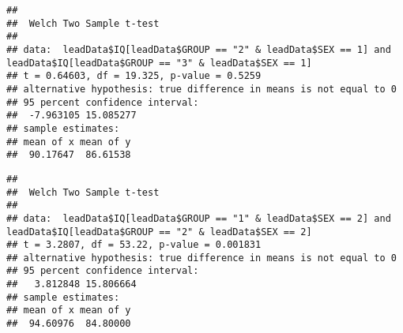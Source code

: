 \documentclass[
]{article}
\newenvironment{Shaded}{\begin{snugshade}}{\end{snugshade}}
\newcommand{\DataTypeTok}[1]{\textcolor[rgb]{0.13,0.29,0.53}{#1}}
\newcommand{\DecValTok}[1]{\textcolor[rgb]{0.00,0.00,0.81}{#1}}
\newcommand{\KeywordTok}[1]{\textcolor[rgb]{0.13,0.29,0.53}{\textbf{#1}}}
\newcommand{\NormalTok}[1]{#1}
\newcommand{\OperatorTok}[1]{\textcolor[rgb]{0.81,0.36,0.00}{\textbf{#1}}}
\newcommand{\StringTok}[1]{\textcolor[rgb]{0.31,0.60,0.02}{#1}}
\begin{document}
\begin{verbatim}
## 
##  Welch Two Sample t-test
## 
## data:  leadData$IQ[leadData$GROUP == "2" & leadData$SEX == 1] and leadData$IQ[leadData$GROUP == "3" & leadData$SEX == 1]
## t = 0.64603, df = 19.325, p-value = 0.5259
## alternative hypothesis: true difference in means is not equal to 0
## 95 percent confidence interval:
##  -7.963105 15.085277
## sample estimates:
## mean of x mean of y 
##  90.17647  86.61538
\end{verbatim}

\begin{Shaded}
\end{Shaded}

\begin{verbatim}
## 
##  Welch Two Sample t-test
## 
## data:  leadData$IQ[leadData$GROUP == "1" & leadData$SEX == 2] and leadData$IQ[leadData$GROUP == "2" & leadData$SEX == 2]
## t = 3.2807, df = 53.22, p-value = 0.001831
## alternative hypothesis: true difference in means is not equal to 0
## 95 percent confidence interval:
##   3.812848 15.806664
## sample estimates:
## mean of x mean of y 
##  94.60976  84.80000
\end{verbatim}

\begin{Shaded}
\end{Shaded}
\end{document}
